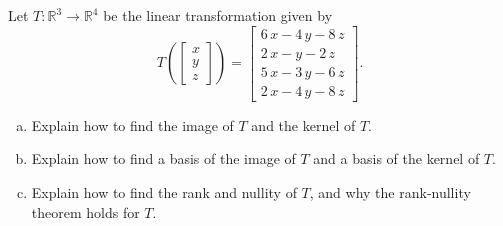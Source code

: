 
\begin{exerciseStatement}
 Let \(T:\mathbb{R}^ 3  \to \mathbb{R}^ 4 \) be the linear transformation given by \[T\left(  \left[\begin{array}{c}
x \\
y \\
z
\end{array}\right]  \right) =  \left[\begin{array}{c}
6 \, x - 4 \, y - 8 \, z \\
2 \, x - y - 2 \, z \\
5 \, x - 3 \, y - 6 \, z \\
2 \, x - 4 \, y - 8 \, z
\end{array}\right] .\]
\begin{enumerate}[(a)]
\item Explain how to find the image of \(T\) and the kernel of \(T\).
\item Explain how to find a basis of the image of \(T\) and a basis of the kernel of \(T\).
\item Explain how to find the rank and nullity of \(T\), and why the rank-nullity theorem holds for \(T\).
\end{enumerate}
    
\end{exerciseStatement}
    
